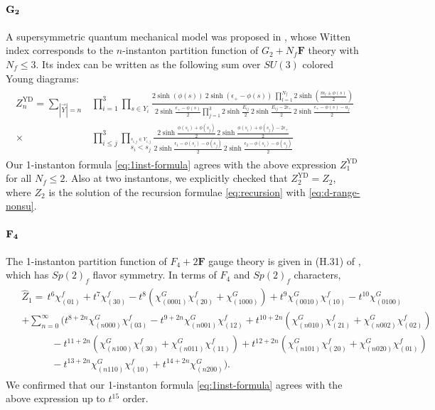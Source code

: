 \documentclass[letterpaper, 11pt]{article}
\def\e{\epsilon}
\begin{document}
{\paragraph{$\bf G_2$}
A supersymmetric quantum mechanical model was proposed in  \cite{Kim:2018gjo}, whose Witten index corresponds to the $n$-instanton partition function of 
$G_2 + N_f \mathbf{F}$ theory with $N_f \leq 3$. Its index can be written as the following sum over $SU(3)$ colored Young diagrams:
\begin{align}
\begin{split}
  Z_n^\text{YD} = \sum_{|\vec{Y}| = n} &\prod_{i=1}^3\prod_{s \in Y_i}\frac{2\sinh{(\phi(s))} \ 2\sinh{(\e_+-\phi(s))} \ \prod_{l=1}^{N_f}2\sinh(\frac{m_l \pm \phi(s)}{2}) }{2\sinh{\frac{\e_+ - \phi(s)}{2}}\prod_{j=1}^3 2\sinh{\frac{E_{ij}}{2}}\,2\sinh{\frac{E_{ij}-2\e_+}{2}}\,2\sinh{\frac{\e_+ - \phi(s) - a_j}{2}}} \\ \times &\prod_{i \leq j}^3 \prod_{\stackrel{s_{i,j} \in Y_{i,j}}{s_i < s_j}} \frac{2\sinh{\frac{\phi(s_i)+\phi(s_j)}{2}}\, 2\sinh{\frac{\phi(s_i)+\phi(s_j)-2\e_+}{2}}}{ 2\sinh{\frac{\e_1 - \phi(s_i)-\phi(s_j)}{2}} \, 2\sinh{\frac{\e_2 - \phi(s_i)-\phi(s_j)}{2}}}
\end{split}
\end{align}
Our 1-instanton formula \eqref{eq:1inst-formula} agrees with the above expression $Z_1^\text{YD}$ for all $N_f \leq 2$. Also at two instantons, we explicitly checked that $Z_2^\text{YD} = Z_2$, where $Z_2$ is the solution of the recursion formulae \eqref{eq:recursion} with \eqref{eq:d-range-nonsu}.


\paragraph{$\bf F_4$}
The 1-instanton partition function of $F_4 + 2 \mathbf{F}$ gauge theory is given in (H.31) of \cite{DelZotto:2018tcj}, which has $Sp(2)_f$ flavor symmetry. In terms of $F_4$ and $Sp(2)_f$ characters, 
\begin{align}
    \label{eq:F4F2}
\begin{split}
  & \hat{Z}_1 =\,t^6\chi^f_{(01)}+t^7\chi^{f}_{(30)}-t^8\left(\chi^G_{(0001)}\chi^f_{(20)}+\chi^G_{(1000)}\right)+t^9\chi^G_{(0010)}\chi^f_{(10)}-t^{10}\chi^G_{(0100)}\\
  &+\sum_{n=0}^{\infty}\Bigg(t^{8+2n}\chi^G_{(n000)}\chi^f_{(03)}-t^{9+2n}\chi^G_{(n001)}\chi^f_{(12)}+t^{10+2n}\left(\chi^G_{(n010)}\chi^f_{(21)}+\chi^G_{(n002)}\chi^f_{(02)}\right)\\
  &\qquad\quad-t^{11+2n}\left(\chi^G_{(n100)}\chi^f_{(30)}+\chi^G_{(n011)}\chi^f_{(11)}\right) 
  +t^{12+2n}\left(\chi^G_{(n101)}\chi^f_{(20)}+\chi^G_{(n020)}\chi^f_{(01)}\right)\\
  &\qquad\quad-t^{13+2n}\chi^G_{(n110)}\chi^f_{(10)}+t^{14+2n}\chi^G_{(n200)}\Bigg).
\end{split}
\end{align}
We confirmed that our 1-instanton formula \eqref{eq:1inst-formula} agrees with the above expression up to $t^{15}$ order. 


}
\end{document}

